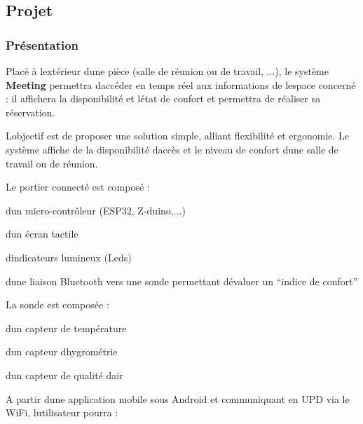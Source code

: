 \hypertarget{page__r_e_a_d_m_e_projet}{}\subsection{Projet}\label{page__r_e_a_d_m_e_projet}
\hypertarget{page__r_e_a_d_m_e_presentation}{}\subsubsection{Présentation}\label{page__r_e_a_d_m_e_presentation}
Placé à l\textquotesingle{}extérieur d\textquotesingle{}une pièce (salle de réunion ou de travail, ...), le système {\bfseries Meeting} permettra d\textquotesingle{}accéder en temps réel aux informations de l\textquotesingle{}espace concerné \+: il affichera la disponibilité et l\textquotesingle{}état de confort et permettra de réaliser sa réservation.

L\textquotesingle{}objectif est de proposer une solution simple, alliant flexibilité et ergonomie. Le système affiche de la disponibilité d\textquotesingle{}accès et le niveau de confort d\textquotesingle{}une salle de travail ou de réunion.

Le portier connecté est composé \+:


\begin{DoxyItemize}
\item d\textquotesingle{}un micro-\/contrôleur (E\+S\+P32, Z-\/duino,...)
\item d\textquotesingle{}un écran tactile
\item d\textquotesingle{}indicateurs lumineux (Leds)
\item d\textquotesingle{}une liaison Bluetooth vers une sonde permettant d\textquotesingle{}évaluer un “indice de confort”
\end{DoxyItemize}

La sonde est composée \+:


\begin{DoxyItemize}
\item d\textquotesingle{}un capteur de température
\item d\textquotesingle{}un capteur d\textquotesingle{}hygrométrie
\item d\textquotesingle{}un capteur de qualité d\textquotesingle{}air
\end{DoxyItemize}

A partir d\textquotesingle{}une application mobile sous Android et communiquant en U\+PD via le Wi\+Fi, l\textquotesingle{}utilisateur pourra \+:


